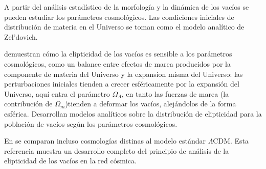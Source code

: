 \documentclass[preprint]{aastex62}
\begin{document}
  A partir del análisis estadístico de la morfología y la dinámica de los vacíos se pueden estudiar
  los parámetros cosmológicos. Las condiciones iniciales de distribución de materia en el Universo
  se toman como el modelo analítico de Zel'dovich. 

  \citet{Park-Lee2007}
  demuestran cómo la elipticidad de los vacíos
  es sensible a los parámetros cosmológicos, como un balance entre efectos de marea producidos
  por la componente de materia del Universo y la expansion misma del Universo: las perturbaciones
  iniciales tienden a crecer esféricamente por la expansión del Universo, aquí entra el parámetro
  $\Omega_\Lambda$, en tanto las fuerzas de marea (la contribución de $\Omega_m$)tienden a deformar
  los vacíos, alejándolos de la forma esférica. Desarrollan modelos analíticos sobre la distribución
  de elipticidad para la población de vacíos según los parámetros cosmológicos.

  En \citet{Bos2012} se comparan incluso cosmologías distinas al modelo
  estándar $\Lambda$CDM. Esta referencia muestra un desarrollo completo del principio de análisis de
  la elipticidad de los vacíos en la red cósmica.
\end{document}
